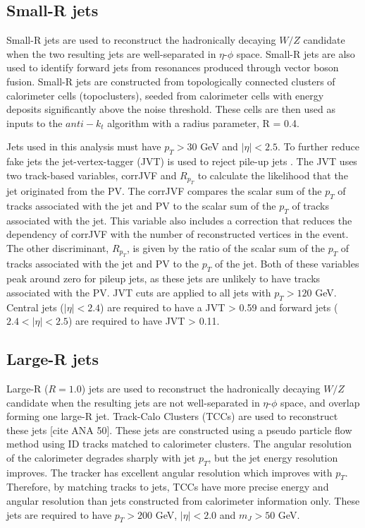 \subsection{Small-R jets}
Small-R jets are used to reconstruct the hadronically decaying $W/Z$ candidate when the two resulting jets are well-separated in $\eta$-$\phi$ space. Small-R jets are also used to identify forward jets from resonances produced through vector boson fusion. Small-R jets are constructed from topologically connected clusters of calorimeter cells (topoclusters), seeded from calorimeter cells with energy deposits significantly above the noise threshold.  These cells are then used as inputs to the $anti-k_{t}$ algorithm \cite{antikt} with a radius parameter, R = 0.4. 

Jets used in this analysis must have $p_{T} > 30$ GeV and $|\eta| < 2.5$. To further reduce fake jets the jet-vertex-tagger (JVT) is used to reject pile-up jets \cite{jvt}. The JVT uses two track-based variables, corrJVF and $R_{p_{T}}$ to calculate the likelihood that the jet originated from the PV. The corrJVF compares the scalar sum of the $p_{T}$ of tracks associated with the jet and PV to the scalar sum of the $p_{T}$ of tracks associated with the jet. This variable also includes a correction that reduces the dependency of corrJVF with the number of reconstructed vertices in the event. The other discriminant, $R_{p_{T}}$, is given by the ratio of the scalar sum of the $p_{T}$ of tracks associated with the jet and PV to the $p_{T}$ of the jet. Both of these variables peak around zero for pileup jets, as these jets are unlikely to have tracks associated with the PV. JVT cuts are applied to all jets with $p_{T} > 120$ GeV. Central jets ($|\eta| < 2.4$) are required to have a JVT > 0.59 and forward jets ($2.4<|\eta| < 2.5$) are required to have JVT > 0.11. 

\subsection{Large-R jets}
Large-R ($R = 1.0$) jets are used to reconstruct the hadronically decaying $W/Z$ candidate when the resulting jets are not well-separated in $\eta$-$\phi$ space, and overlap forming one large-R jet. Track-Calo Clusters (TCCs) are used to reconstruct these jets [cite ANA 50]. These jets are constructed using a pseudo particle flow method using ID tracks matched to calorimeter clusters. The angular resolution of the calorimeter degrades sharply with jet $p_{T}$, but the jet energy resolution improves. The tracker has excellent angular resolution which improves with $p_{T}$. Therefore, by matching tracks to jets, TCCs have more precise energy and angular resolution than jets constructed from calorimeter information only. These jets are required to have $p_{T}>200$ GeV, $|\eta| < 2.0$ and $m_{J} > 50$ GeV. 

